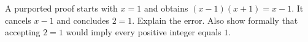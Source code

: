 A purported proof starts with $x=1$ and obtains $(x-1)(x+1)=x-1$. It cancels $x-1$ and concludes $2=1$. Explain the error. Also show formally that accepting $2=1$ would imply every positive integer equals $1$.
